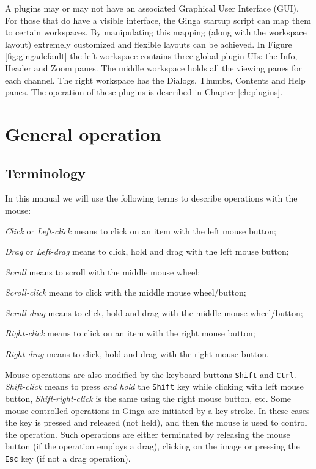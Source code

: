 \documentclass[11pt]{report}
\begin{document}
A plugins may or may not have an associated Graphical User Interface (GUI).
For those that do have a visible interface, the Ginga startup script
can map them to certain workspaces.  By manipulating this mapping (along
with the workspace layout) extremely customized and flexible layouts can
be achieved.  
In Figure \ref{fig:gingadefault} the left workspace contains three
global plugin UIs: the Info, Header and Zoom panes.  The middle workspace
holds all the viewing panes for each channel.  The right workspace has
the Dialogs, Thumbs, Contents and Help panes.  The operation of these
plugins is described in Chapter \ref{ch:plugins}. 

\section{General operation}
\label{sec:generalop}

\subsection{Terminology}
In this manual we will use the following terms to describe operations
with the mouse:
\begin{itemize*}
\item \emph{Click} or \emph{Left-click} means to click on an item with
  the left mouse button;
\item \emph{Drag} or \emph{Left-drag} means to click, hold and drag with
  the left mouse button;
\item \emph{Scroll} means to scroll with the middle mouse wheel;
\item \emph{Scroll-click} means to click with the middle mouse wheel/button;
\item \emph{Scroll-drag} means to click, hold and drag with the middle
  mouse wheel/button; 
\item \emph{Right-click} means to click on an item with the right mouse
  button; 
\item \emph{Right-drag} means to click, hold and drag with the right
  mouse button.
\end{itemize*}

Mouse operations are also modified by the keyboard buttons {\tt Shift}
and {\tt Ctrl}.  \emph{Shift-click} means to press \emph{and hold} the
{\tt Shift} key while clicking with left mouse button,
\emph{Shift-right-click} is the same using the right mouse button,
etc.
Some mouse-controlled operations in Ginga are initiated by a key stroke.
In these cases the key is pressed and released (not held), and then the
mouse is used to control the operation.  Such operations are either
terminated by releasing the mouse button (if the operation employs a
drag), clicking on the image or pressing the {\tt Esc} key (if not a
drag operation).
\end{document}
